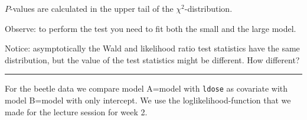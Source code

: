 \documentclass[
]{article}
\begin{document}
\(P\)-values are calculated in the upper tail of the
\(\chi^2\)-distribution.

Observe: to perform the test you need to fit both the small and the
large model.

Notice: asymptotically the Wald and likelihood ratio test statistics
have the same distribution, but the value of the test statistics might
be different. How different?

\begin{center}\rule{0.5\linewidth}{0.5pt}\end{center}

For the beetle data we compare model A=model with \texttt{ldose} as
covariate with model B=model with only intercept. We use the
loglikelihood-function that we made for the lecture session for week 2.
\end{document}
